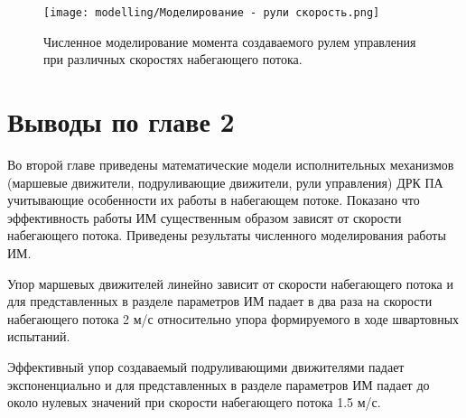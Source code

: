 

\begin{figure}[ht]
    \centering
    \texttt{[image: modelling/Моделирование - рули скорость.png]}
    \caption{Численное моделирование момента создаваемого рулем управления при различных скоростях набегающего потока.}
    \label{fig:modelling-rudder-velocity}
\end{figure}

\section{Выводы по главе 2}
Во второй главе приведены математические модели исполнительных механизмов (маршевые движители, подруливающие движители, рули управления) ДРК ПА учитывающие особенности их работы в набегающем потоке.
Показано что эффективность работы ИМ существенным образом зависят от скорости набегающего потока. 
Приведены результаты численного моделирования работы ИМ.

Упор маршевых движителей линейно зависит от скорости набегающего потока и для представленных в разделе параметров ИМ падает в два раза на скорости набегающего потока 2 м/с относительно упора формируемого в ходе швартовных испытаний.

Эффективный упор создаваемый подруливающими движителями падает экспоненциально и для представленных в разделе параметров ИМ падает до около нулевых значений при скорости набегающего потока 1.5 м/с.